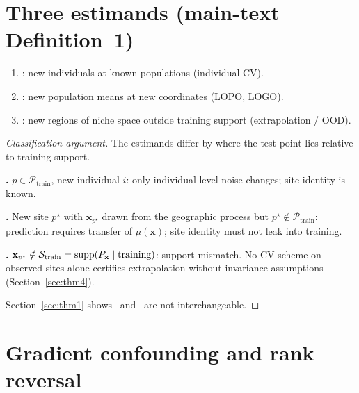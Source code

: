 \documentclass[11pt]{article}
\begin{document}
\section{Three estimands (main-text Definition~1)}
\label{sec:def-estimands}

\begin{definition}
\label{def:esm-three-estimands}
\begin{enumerate}
  \item \Eone: new individuals at known populations (individual CV).
  \item \Etwo: new population means at new coordinates (LOPO, LOGO).
  \item \Ethree: new regions of niche space outside training support
        (extrapolation / OOD).
\end{enumerate}
\end{definition}

\begin{proof}[Classification argument]
The estimands differ by where the test point lies relative to training
support.

\textbf{\Eone.}  $p\in\mathcal{P}_{\mathrm{train}}$, new individual $i$:
only individual-level noise changes; site identity is known.

\textbf{\Etwo.}  New site $p^\star$ with $\mathbf{x}_{p^\star}$ drawn from
the geographic process but $p^\star\notin\mathcal{P}_{\mathrm{train}}$:
prediction requires transfer of $\mu(\mathbf{x})$; site identity must not
leak into training.

\textbf{\Ethree.}  $\mathbf{x}_{p^\star}\notin\mathcal{S}_{\mathrm{train}}
=\mathrm{supp}(P_{\mathbf{x}}\mid\text{training})$: support mismatch.  No CV scheme
on observed sites alone certifies extrapolation without invariance
assumptions (Section~\ref{sec:thm4}).

Section~\ref{sec:thm1} shows \Eone\ and \Etwo\ are not interchangeable.
\end{proof}

\section{Gradient confounding and rank reversal}
\label{sec:thm23}
\end{document}
